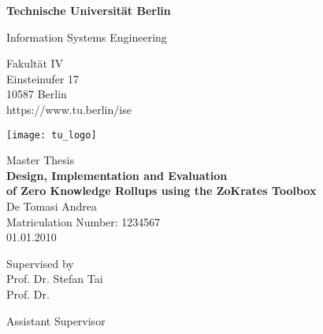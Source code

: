 \thispagestyle{empty}
\begin{center}

\vspace*{1.4cm}
{\LARGE \textbf{Technische Universität Berlin}}

\vspace{0.5cm}

{\large Information Systems Engineering\\[1mm]}

Fakultät IV\\
Einsteinufer 17\\
10587 Berlin\\
https://www.tu.berlin/ise\\

\vspace*{1cm}

\texttt{[image: tu\_logo]}

\vspace*{1.0cm}

{\LARGE Master Thesis}\\

\vspace{1.0cm}
{\LARGE \textbf{Design, Implementation and Evaluation}}\\
\vspace*{0.3cm}
{\LARGE \textbf{of Zero Knowledge Rollups using the ZoKrates Toolbox}}\\
\vspace*{1.0cm}
{\LARGE De Tomasi Andrea}
\\
\vspace*{0.5cm}
Matriculation Number: 1234567\\
01.01.2010\\ %
\vspace*{1.0cm}

Supervised by\\
Prof. Dr. Stefan Tai\\
Prof. Dr. 

\vspace*{0.5cm}
Assistant Supervisor\\
\vspace{3cm}


\end{center}


